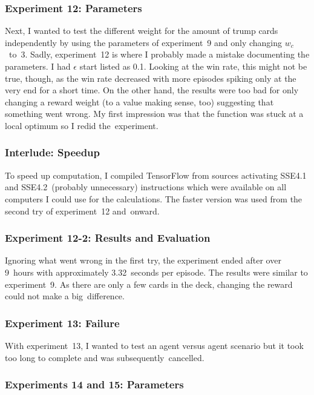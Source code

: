 \documentclass[a4paper,titlepage]{article}
\begin{document}
\subsubsection*{Experiment 12: Parameters}

Next, I wanted to test the different weight for the amount of trump cards independently by using the parameters of experiment~9 and only changing $w_c$~to~3. Sadly, experiment~12 is where I probably made a mistake documenting the parameters. I had $\epsilon$ start listed as 0.1. Looking at the win rate, this might not be true, though, as the win rate decreased with more episodes spiking only at the very end for a short time. On the other hand, the results were too bad for only changing a reward weight (to a value making sense, too) suggesting that something went wrong. My first impression was that the function was stuck at a local optimum so I redid the~experiment.

\subsubsection*{Interlude: Speedup}

To speed up computation, I compiled TensorFlow from sources activating SSE4.1 and SSE4.2~(probably unnecessary) instructions which were available on all computers I could use for the calculations. The faster version was used from the second try of experiment~12 and~onward.

\subsubsection*{Experiment 12-2: Results and Evaluation}

Ignoring what went wrong in the first try, the experiment ended after over 9~hours with approximately 3.32~seconds per episode. The results were similar to experiment~9. As there are only a few cards in the deck, changing the reward could not make a big~difference.

\subsubsection*{Experiment 13: Failure}

With experiment~13, I wanted to test an agent versus agent scenario but it took too long to complete and was subsequently~cancelled.

\subsubsection*{Experiments 14 and 15: Parameters}
\end{document}

